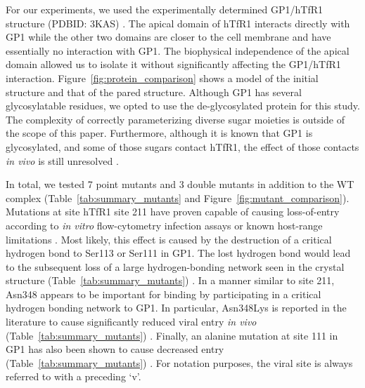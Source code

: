 \documentclass[12pt]{article}
\begin{document}
For our experiments, we used the experimentally determined GP1/hTfR1 structure (PDBID: 3KAS) \citep{Abraham2010}. The apical domain of hTfR1 interacts directly with GP1 while the other two domains are closer to the cell membrane and have essentially no interaction with GP1. The biophysical independence of the apical domain allowed us to isolate it without significantly affecting the GP1/hTfR1 interaction. Figure~\ref{fig:protein_comparison} shows a model of the initial structure and that of the pared structure. Although GP1 has several glycosylatable residues, we opted to use the de-glycosylated protein for this study. The complexity of correctly parameterizing diverse sugar moieties is outside of the scope of this paper. Furthermore, although it is known that GP1 is glycosylated, and some of those sugars contact hTfR1, the effect of those contacts \textit{in vivo} is still unresolved \citep{Abraham2010}.

In total, we tested 7 point mutants and 3 double mutants in addition to the WT complex (Table~\ref{tab:summary_mutants} and Figure~\ref{fig:mutant_comparison}). Mutations at site hTfR1 site 211 have proven capable of causing loss-of-entry according to \textit{in vitro} flow-cytometry infection assays or known host-range limitations \citep{Rad2008,Rad20111,Rad20112}. Most likely, this effect is caused by the destruction of a critical hydrogen bond to Ser113 or Ser111 in GP1. The lost hydrogen bond would lead to the subsequent loss of a large hydrogen-bonding network seen in the crystal structure (Table~\ref{tab:summary_mutants}) \citep{Abraham2010}. In a manner similar to site 211, Asn348 appears to be important for binding by participating in a critical hydrogen bonding network \citep{Rad2008,Abraham2010} to GP1. In particular, Asn348Lys is reported in the literature to cause significantly reduced viral entry \textit{in vivo} (Table~\ref{tab:summary_mutants}) \citep{Rad2008,Abraham2010}. Finally, an alanine mutation at site 111 in GP1 has also been shown to cause decreased entry (Table~\ref{tab:summary_mutants}) \citep{Rad20112}. For notation purposes, the viral site is always referred to with a preceding `v'.  
\end{document}
